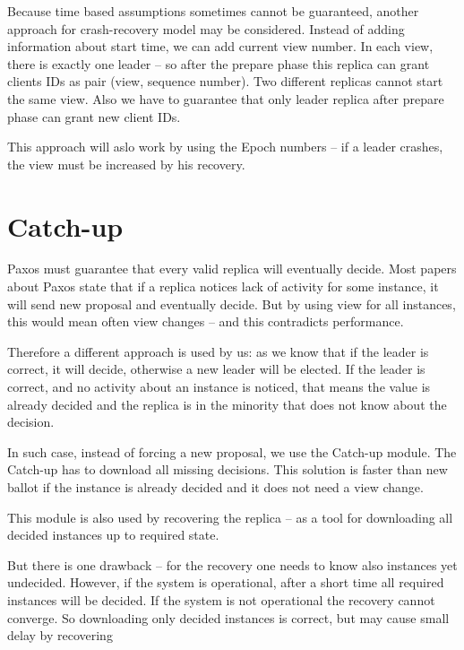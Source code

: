 Because time based assumptions sometimes cannot be guaranteed, another approach for crash-recovery model may be considered. Instead of adding information about start time, we can add current view number. In each view, there is exactly one leader -- so after the prepare phase this replica can grant clients IDs as pair (view, sequence number). Two different replicas cannot start the same view.
Also we have to guarantee that only leader replica after prepare phase can grant new client IDs.

This approach will aslo work by using the Epoch numbers -- if a leader crashes, the view must be increased by his recovery.


\section{Catch-up}
\label{sec:catch_up}


Paxos must guarantee that every valid replica will eventually decide. Most papers about Paxos state that if a replica notices lack of activity for some instance, it will send new proposal and eventually decide. But by using view for all instances, this would mean often view changes -- and this contradicts performance.

Therefore a different approach is used by us: as we know that if the leader is correct, it will decide, otherwise a new leader will be elected. If the leader is correct, and no activity about an instance is noticed, that means the value is already decided and the replica is in the minority that does not know  about the decision.

In such case, instead of forcing a new proposal, we use the Catch-up module.
The Catch-up has to download all missing decisions. This solution is faster than new ballot if the instance is already decided and it does not need a view change.


This module is also used by recovering the replica -- as a tool for downloading all decided instances up to required state.

But there is one drawback -- for the recovery one needs to know also instances yet undecided.  However, if the system is operational, after a short time all required instances will be decided. If the system is not operational the recovery cannot converge. So downloading only decided instances is correct, but may cause small delay by recovering

